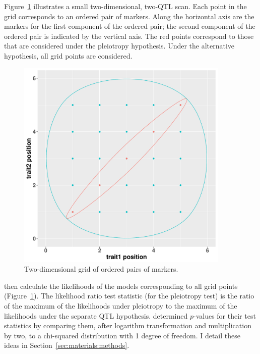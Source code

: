 \documentclass[oneside]{book}\usepackage[]{graphicx}\usepackage[]{color}
\newenvironment{knitrout}{}{} %
\begin{document}
Figure~\ref{fig:encircle} illustrates a small two-dimensional, two-QTL scan. 
Each point in the grid corresponds to an ordered pair of
markers. Along the horizontal axis are the markers for the first component of the
ordered pair; the second component of the ordered pair is indicated by the vertical
axis. The red points correspond to those that are considered under the pleiotropy
hypothesis. Under the alternative hypothesis, all grid points are considered.





\begin{knitrout}
\color{fgcolor}\begin{figure}
\includegraphics[width=4in,height=4in]{figure/encircle-1} \caption[Two-dimensional grid of ordered pairs of markers]{Two-dimensional grid of ordered pairs of markers.}\label{fig:encircle}
\end{figure}


\end{knitrout}



\citet{jiang1995multiple} then calculate the likelihoods of the models
corresponding to all grid points (Figure~\ref{fig:encircle}).
The likelihood ratio test statistic (for the pleiotropy test)
is the ratio of the maximum
of the likelihoods under pleiotropy to the maximum of the likelihoods under
the separate QTL hypothesis. \citet{jiang1995multiple} determined
$p$-values for their test statistics by comparing
them, after logarithm transformation and multiplication by two,
to a chi-squared distribution with 1 degree of freedom. 
I detail these ideas in Section~\ref{sec:materials:methods}.
\end{document}
